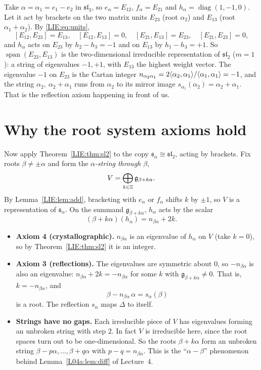 \begin{example}\label{LIE:ex:string}
Take $\alpha=\alpha_1=e_1-e_2$ in $\mathfrak{sl}_3$, so $e_\alpha=E_{12}$, $f_\alpha=E_{21}$ and
$h_\alpha=\operatorname{diag}(1,-1,0)$. Let it act by brackets on the two matrix units $E_{23}$ (root
$\alpha_2$) and $E_{13}$ (root $\alpha_1+\alpha_2$). By \eqref{LIE:eq:units},
\[
  [E_{12},E_{23}]=E_{13},\quad [E_{12},E_{13}]=0,\quad [E_{21},E_{13}]=E_{23},\quad [E_{21},E_{23}]=0,
\]
and $h_\alpha$ acts on $E_{23}$ by $h_2-h_3=-1$ and on $E_{13}$ by $h_1-h_3=+1$. So
$\operatorname{span}(E_{23},E_{13})$ is the two-dimensional irreducible representation of $\mathfrak{sl}_2$
($m=1$): a string of eigenvalues $-1,+1$, with $E_{13}$ the highest weight vector. The eigenvalue $-1$
on $E_{23}$ is the Cartan integer $n_{\alpha_2\alpha_1}=2\langle \alpha_2, \alpha_1\rangle/\langle \alpha_1, \alpha_1\rangle=-1$,
and the string $\alpha_2,\ \alpha_2+\alpha_1$ runs from $\alpha_2$ to its mirror image
$s_{\alpha_1}(\alpha_2)=\alpha_2+\alpha_1$. That is the reflection axiom happening in front of us.
\end{example}

\section{Why the root system axioms hold}
\label{LIE:sec:axioms}

Now apply Theorem~\ref{LIE:thm:sl2} to the copy $\mathfrak s_\alpha\cong\mathfrak{sl}_2$, acting by
brackets. Fix roots $\beta\neq\pm\alpha$ and form the \emph{$\alpha$-string through $\beta$},
\[
  V=\bigoplus_{k\in\mathbb{Z}}\mathfrak g_{\beta+k\alpha}.
\]
By Lemma~\ref{LIE:lem:add}, bracketing with $e_\alpha$ or $f_\alpha$ shifts $k$ by $\pm1$, so $V$ is a
representation of $\mathfrak s_\alpha$. On the summand $\mathfrak g_{\beta+k\alpha}$, $h_\alpha$ acts by the
scalar
\[
  (\beta+k\alpha)(h_\alpha)=n_{\beta\alpha}+2k .
\]

\begin{itemize}
\item \textbf{Axiom 4 (crystallographic).} $n_{\beta\alpha}$ is an eigenvalue of $h_\alpha$ on $V$
  (take $k=0$), so by Theorem~\ref{LIE:thm:sl2} it is an integer.
\item \textbf{Axiom 3 (reflections).} The eigenvalues are symmetric about $0$, so $-n_{\beta\alpha}$ is
  also an eigenvalue: $n_{\beta\alpha}+2k=-n_{\beta\alpha}$ for some $k$ with
  $\mathfrak g_{\beta+k\alpha}\neq0$. That is, $k=-n_{\beta\alpha}$, and
  \[
    \beta-n_{\beta\alpha}\,\alpha=s_\alpha(\beta)
  \]
  is a root. The reflection $s_\alpha$ maps $\Delta$ to itself.
\item \textbf{Strings have no gaps.} Each irreducible piece of $V$ has eigenvalues forming an unbroken
  string with step $2$. In fact $V$ is irreducible here, since the root spaces turn out to be
  one-dimensional. So the roots $\beta+k\alpha$ form an unbroken string $\beta-p\alpha,\dots,\beta+q\alpha$
  with $p-q=n_{\beta\alpha}$. This is the ``$\alpha-\beta$'' phenomenon behind Lemma~\ref{L04a:lem:diff} of Lecture~4.
\end{itemize}

